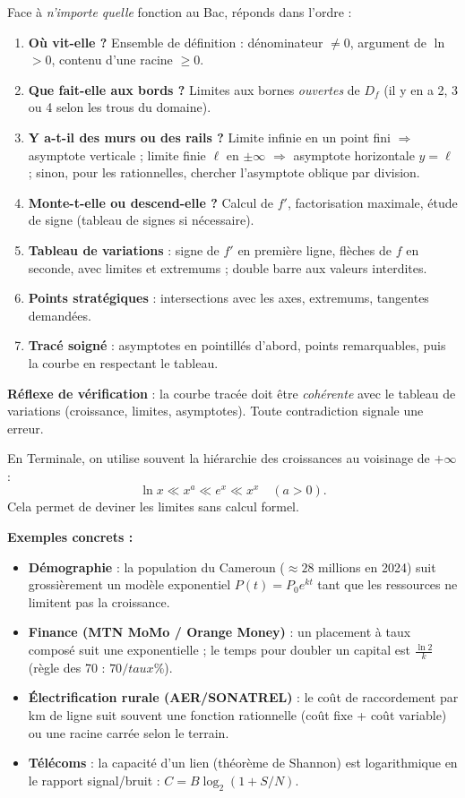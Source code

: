 \documentclass[11pt]{article}
\begin{document}
\begin{methode}
Face à \emph{n'importe quelle} fonction au Bac, réponds dans l'ordre :
\begin{enumerate}
\item \textbf{Où vit-elle ?} Ensemble de définition : dénominateur $\neq 0$, argument de $\ln$ $>0$, contenu d'une racine $\geq 0$.
\item \textbf{Que fait-elle aux bords ?} Limites aux bornes \emph{ouvertes} de $D_f$ (il y en a 2, 3 ou 4 selon les trous du domaine).
\item \textbf{Y a-t-il des murs ou des rails ?} Limite infinie en un point fini $\Rightarrow$ asymptote verticale ; limite finie $\ell$ en $\pm\infty$ $\Rightarrow$ asymptote horizontale $y=\ell$ ; sinon, pour les rationnelles, chercher l'asymptote oblique par division.
\item \textbf{Monte-t-elle ou descend-elle ?} Calcul de $f'$, factorisation maximale, étude de signe (tableau de signes si nécessaire).
\item \textbf{Tableau de variations} : signe de $f'$ en première ligne, flèches de $f$ en seconde, avec limites et extremums ; double barre aux valeurs interdites.
\item \textbf{Points stratégiques} : intersections avec les axes, extremums, tangentes demandées.
\item \textbf{Tracé soigné} : asymptotes en pointillés d'abord, points remarquables, puis la courbe en respectant le tableau.
\end{enumerate}
\textbf{Réflexe de vérification} : la courbe tracée doit être \emph{cohérente} avec le tableau de variations (croissance, limites, asymptotes). Toute contradiction signale une erreur.
\end{methode}

\begin{savaistu}
En Terminale, on utilise souvent la hiérarchie des croissances au voisinage de $+\infty$ :
\[
\ln x \ll x^a \ll e^x \ll x^x \quad (a>0).
\]
Cela permet de deviner les limites sans calcul formel.
\par\textbf{Exemples concrets :}
\begin{itemize}
\item \textbf{Démographie} : la population du Cameroun ($\approx 28$ millions en 2024) suit grossièrement un modèle exponentiel $P(t)=P_0 e^{kt}$ tant que les ressources ne limitent pas la croissance.
\item \textbf{Finance (MTN MoMo / Orange Money)} : un placement à taux composé suit une exponentielle ; le temps pour doubler un capital est $\frac{\ln 2}{k}$ (règle des 70 : $70/taux\%$).
\item \textbf{Électrification rurale (AER/SONATREL)} : le coût de raccordement par km de ligne suit souvent une fonction rationnelle (coût fixe + coût variable) ou une racine carrée selon le terrain.
\item \textbf{Télécoms} : la capacité d'un lien (théorème de Shannon) est logarithmique en le rapport signal/bruit : $C = B \log_2(1+S/N)$.
\end{itemize}
\end{savaistu}
\end{document}
